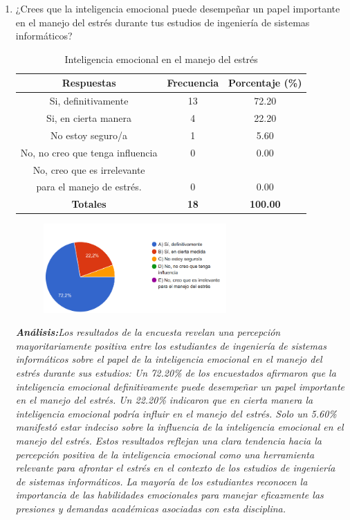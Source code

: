 \documentclass[journal]{IEEEtran}
\begin{document}
\begin{enumerate}
\item¿Crees que la inteligencia emocional puede desempeñar un papel importante en el manejo del estrés durante tus estudios de ingeniería de sistemas informáticos?
	\begin{table}[H]
		\renewcommand{\arraystretch}{1.3}
		\centering
		\caption{Inteligencia emocional en el manejo del estrés}
		\begin{tabular}{c c c}
			\hline
			\textbf{Respuestas} & \textbf{Frecuencia} & \textbf{Porcentaje (\%)}\\
			\hline
			Si, definitivamente & 13 & 72.20 \\
			Si, en cierta manera & 4 & 22.20 \\
			No estoy seguro/a & 1 & 5.60\\
			No, no creo que tenga influencia & 0 & 0.00\\
			No, creo que es irrelevante \\ para el manejo de estrés. & 0 & 0.00\\
			\hline
			\textbf{Totales} &\textbf{18}& \textbf{100.00}\\
			\hline
		\end{tabular}
	\end{table}
	\begin{figure}[h]
		\centering
		\includegraphics[width=07cm]{Pregunta12}
	\end{figure}
	\textit{\textbf{Análisis:}Los resultados de la encuesta revelan una percepción mayoritariamente positiva entre los estudiantes de ingeniería de sistemas informáticos sobre el papel de la inteligencia emocional en el manejo del estrés durante sus estudios:
Un 72.20\% de los encuestados afirmaron que la inteligencia emocional definitivamente puede desempeñar un papel importante en el manejo del estrés.
Un 22.20\% indicaron que en cierta manera la inteligencia emocional podría influir en el manejo del estrés.
Solo un 5.60\% manifestó estar indeciso sobre la influencia de la inteligencia emocional en el manejo del estrés.
Estos resultados reflejan una clara tendencia hacia la percepción positiva de la inteligencia emocional como una herramienta relevante para afrontar el estrés en el contexto de los estudios de ingeniería de sistemas informáticos. La mayoría de los estudiantes reconocen la importancia de las habilidades emocionales para manejar eficazmente las presiones y demandas académicas asociadas con esta disciplina.
}
\end{enumerate}
\end{document}
